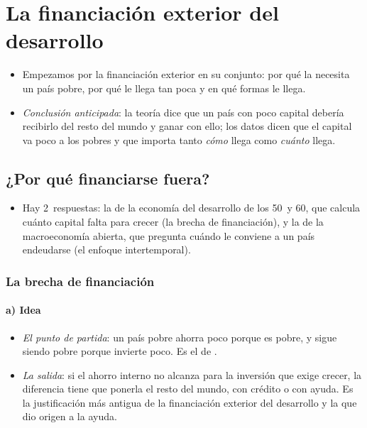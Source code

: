 \documentclass[11pt]{article}
\begin{document}
\section{La financiación exterior del desarrollo}\label{sec:financiacion}

\begin{itemize}
\item Empezamos por la financiación exterior en su conjunto: por qué la necesita un país pobre, por qué le llega tan poca y en qué formas le llega.
\item \emph{Conclusión anticipada}: la teoría dice que un país con poco capital debería recibirlo del resto del mundo y ganar con ello; los datos dicen que el capital va poco a los pobres y que importa tanto \emph{cómo} llega como \emph{cuánto} llega.
\end{itemize}

\subsection{¿Por qué financiarse fuera?}\label{sec:brecha}

\begin{itemize}
\item Hay 2~respuestas: la de la economía del desarrollo de los 50~y 60, que calcula cuánto capital falta para crecer (la brecha de financiación), y la de la macroeconomía abierta, que pregunta cuándo le conviene a un país endeudarse (el enfoque intertemporal).
\end{itemize}

\subsubsection{La brecha de financiación}\label{sec:dos-brechas}

\paragraph{a) Idea}

\begin{itemize}
\item \emph{El punto de partida}: un país pobre ahorra poco porque es pobre, y sigue siendo pobre porque invierte poco. Es el  de \textcite{Nurkse1953}.
\item \emph{La salida}: si el ahorro interno no alcanza para la inversión que exige crecer, la diferencia tiene que ponerla el resto del mundo, con crédito o con ayuda. Es la justificación más antigua de la financiación exterior del desarrollo y la que dio origen a la ayuda.
\end{itemize}
\end{document}

